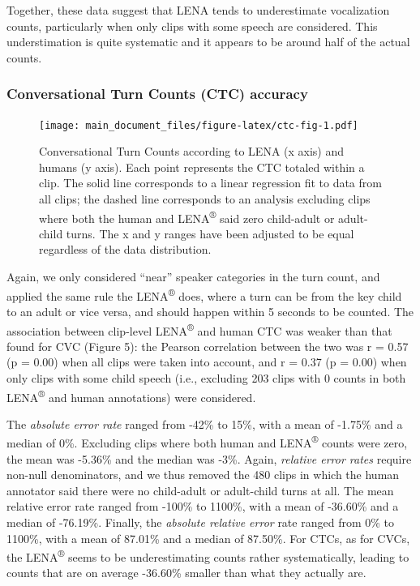 \documentclass[english,table,man,floatsintext]{apa6}
\begin{document}
Together, these data suggest that LENA tends to underestimate vocalization counts, particularly when only clips with some speech are considered. This understimation is quite systematic and it appears to be around half of the actual counts.

\hypertarget{conversational-turn-counts-ctc-accuracy}{%
\subsubsection{Conversational Turn Counts (CTC) accuracy}\label{conversational-turn-counts-ctc-accuracy}}

\begin{figure}
\centering
\texttt{[image: main\_document\_files/figure-latex/ctc-fig-1.pdf]}
\caption{\label{fig:ctc-fig}Conversational Turn Counts according to LENA (x axis) and humans (y axis). Each point represents the CTC totaled within a clip. The solid line corresponds to a linear regression fit to data from all clips; the dashed line corresponds to an analysis excluding clips where both the human and LENA\textsuperscript{®} said zero child-adult or adult-child turns. The x and y ranges have been adjusted to be equal regardless of the data distribution.}
\end{figure}

Again, we only considered \enquote{near} speaker categories in the turn count, and applied the same rule the LENA\textsuperscript{®} does, where a turn can be from the key child to an adult or vice versa, and should happen within 5 seconds to be counted. The association between clip-level LENA\textsuperscript{®} and human CTC was weaker than that found for CVC (Figure 5): the Pearson correlation between the two was r = 0.57 (p = 0.00) when all clips were taken into account, and r = 0.37 (p = 0.00) when only clips with some child speech (i.e., excluding 203 clips with 0 counts in both LENA\textsuperscript{®} and human annotations) were considered.

The \emph{absolute error rate} ranged from -42\% to 15\%, with a mean of -1.75\% and a median of 0\%. Excluding clips where both human and LENA\textsuperscript{®} counts were zero,
the mean was -5.36\% and the median was -3\%. Again, \emph{relative error rates} require non-null denominators, and we thus removed the 480 clips in which the human annotator said there were no child-adult or adult-child turns at all. The mean relative error rate ranged from -100\% to 1100\%, with a mean of -36.60\% and a median of -76.19\%. Finally, the \emph{absolute relative error} rate ranged from 0\% to 1100\%, with a mean of 87.01\% and a median of 87.50\%. For CTCs, as for CVCs, the LENA\textsuperscript{®} seems to be underestimating counts rather systematically, leading to counts that are on average -36.60\% smaller than what they actually are.
\end{document}

